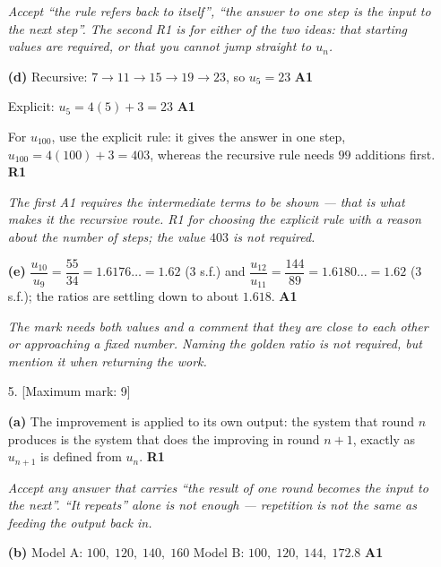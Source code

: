\documentclass[12pt, twoside]{article}
\begin{document}
\begin{enumerate}[itemsep=0.3cm]
\emph{Accept ``the rule refers back to itself'', ``the answer to one step is
the input to the next step''. The second R1 is for either of the two ideas:
that starting values are required, or that you cannot jump straight to
$u_{n}$.}

\medskip

\textbf{(d)} Recursive: $7 \to 11 \to 15 \to 19 \to 23$, so $u_{5} = 23$
\hfill \textbf{A1}

Explicit: $u_{5} = 4(5) + 3 = 23$ \hfill \textbf{A1}

For $u_{100}$, use the explicit rule: it gives the answer in one step,
$u_{100} = 4(100) + 3 = 403$, whereas the recursive rule needs $99$
additions first. \hfill \textbf{R1}

\emph{The first A1 requires the intermediate terms to be shown --- that is
what makes it the recursive route. R1 for choosing the explicit rule with a
reason about the number of steps; the value $403$ is not required.}

\medskip

\textbf{(e)} $\dfrac{u_{10}}{u_{9}} = \dfrac{55}{34} = 1.6176\ldots = 1.62$
(3 s.f.) \quad and \quad
$\dfrac{u_{12}}{u_{11}} = \dfrac{144}{89} = 1.6180\ldots = 1.62$ (3 s.f.);
the ratios are settling down to about $1.618$. \hfill \textbf{A1}

\emph{The mark needs both values and a comment that they are close to each
other or approaching a fixed number. Naming the golden ratio is not
required, but mention it when returning the work.}

\newpage

\item[5.] [Maximum mark: 9]

\medskip

\textbf{(a)} The improvement is applied to its own output: the system that
round $n$ produces is the system that does the improving in round $n + 1$,
exactly as $u_{n+1}$ is defined from $u_{n}$. \hfill \textbf{R1}

\emph{Accept any answer that carries ``the result of one round becomes the
input to the next''. ``It repeats'' alone is not enough --- repetition is not
the same as feeding the output back in.}

\medskip

\textbf{(b)} Model A: $100,\; 120,\; 140,\; 160$ \quad
Model B: $100,\; 120,\; 144,\; 172.8$ \hfill \textbf{A1}


\end{enumerate}
\end{document}
